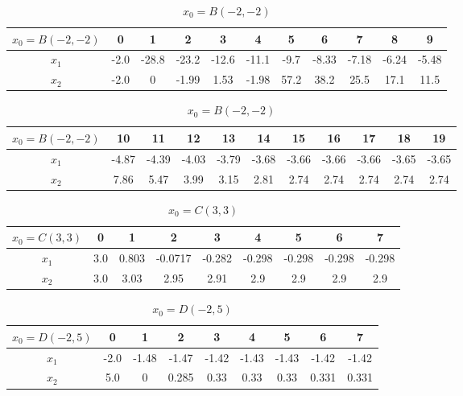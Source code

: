 \begin{table}[H]
\centering
\setlength{\abovecaptionskip}{0cm} 
\setlength{\belowcaptionskip}{-0.5cm} 
\scriptsize
\begin{tabular}{|c|c|c|c|c|c|c|c|c|c|c|}
\hline
$x_0=B(-2,-2)$&0&1&2&3&4&5&6&7&8&9\\
\hline
$x_1$&-2.0 & -28.8 & -23.2 & -12.6 & -11.1 & -9.7 & -8.33 & -7.18 & -6.24 & -5.48 \\
\hline
$x_2$&-2.0 & 0 & -1.99 & 1.53 & -1.98 & 57.2 & 38.2 & 25.5 & 17.1 & 11.5
\\
\hline
\end{tabular}

\begin{tabular}{|c|c|c|c|c|c|c|c|c|c|c|}
\hline
$x_0=B(-2,-2)$&10&11&12&13&14&15&16&17&18&19\\
\hline
$x_1$&-4.87 & -4.39 & -4.03 & -3.79 & -3.68 & -3.66 & -3.66 & -3.66 & -3.65 & -3.65   \\
\hline
$x_2$&7.86 & 5.47 & 3.99 & 3.15 & 2.81 & 2.74 & 2.74 & 2.74 & 2.74 & 2.74  
\\
\hline
\end{tabular}
\caption{$x_0=B(-2,-2)$}
\end{table}
\begin{table}[H]
\centering
\setlength{\abovecaptionskip}{0cm} 
\setlength{\belowcaptionskip}{-0.5cm} 
\scriptsize
\begin{tabular}{|c|c|c|c|c|c|c|c|c|}
\hline
$x_0=C(3,3)$&0&1&2&3&4&5&6&7\\
\hline
$x_1$&3.0 & 0.803 & -0.0717 & -0.282 & -0.298 & -0.298 & -0.298 & -0.298 \\
\hline
$x_2$&3.0 & 3.03 & 2.95 & 2.91 & 2.9 & 2.9 & 2.9 & 2.9  
\\
\hline
\end{tabular}

\caption{$x_0=C(3,3)$}
\end{table}
\begin{table}[H]
\centering
\setlength{\abovecaptionskip}{0cm} 
\setlength{\belowcaptionskip}{-0.5cm} 
\scriptsize
\begin{tabular}{|c|c|c|c|c|c|c|c|c|}
\hline
$x_0=D(-2,5)$&0&1&2&3&4&5&6&7\\
\hline
$x_1$&-2.0 & -1.48 & -1.47 & -1.42 & -1.43 & -1.43 & -1.42 & -1.42   \\
\hline
$x_2$&5.0 & 0 & 0.285 & 0.33 & 0.33 & 0.33 & 0.331 & 0.331
\\
\hline
\end{tabular}
\caption{$x_0=D(-2,5)$}
\end{table}
